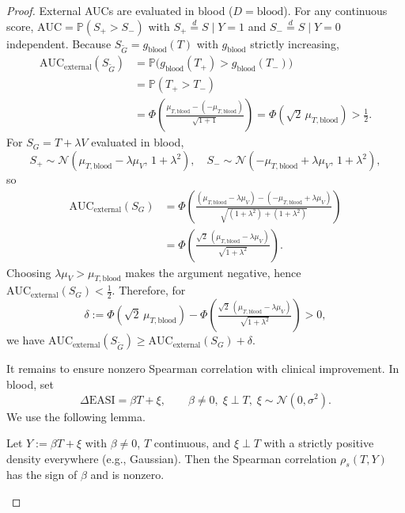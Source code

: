 \begin{proof}
External AUCs are evaluated in blood (\(D{=}\text{blood}\)). For any continuous score, \(\mathrm{AUC}=\mathbb P(S_+>S_-)\) with \(S_+\overset{d}{=}S\mid Y{=}1\) and \(S_-\overset{d}{=}S\mid Y{=}0\) independent. Because \(S_{\tilde G}=g_{\text{blood}}(T)\) with \(g_{\text{blood}}\) strictly increasing,
\[
\begin{aligned}
\mathrm{AUC}_{\text{external}}(S_{\tilde G})
&= \mathbb P\big(g_{\text{blood}}(T_+)>g_{\text{blood}}(T_-)\big)\\
&= \mathbb P(T_+>T_-)\\
&= \Phi\!\left(\frac{\mu_{T,\text{blood}}-(-\mu_{T,\text{blood}})}{\sqrt{1+1}}\right)
= \Phi(\sqrt{2}\,\mu_{T,\text{blood}}) > \tfrac12.
\end{aligned}
\]
For \(S_G=T+\lambda V\) evaluated in blood,
\[
S_+\sim\mathcal N(\mu_{T,\text{blood}}-\lambda\mu_V,\,1+\lambda^2),\quad S_-\sim\mathcal N(-\mu_{T,\text{blood}}+\lambda\mu_V,\,1+\lambda^2),
\]
so
\[
\begin{aligned}
\mathrm{AUC}_{\text{external}}(S_G)
&=\Phi\!\left(\frac{(\mu_{T,\text{blood}}-\lambda\mu_V)-(-\mu_{T,\text{blood}}+\lambda\mu_V)}{\sqrt{(1+\lambda^2)+(1+\lambda^2)}}\right)\\
&=\Phi\!\left(\frac{\sqrt{2}\,(\mu_{T,\text{blood}}-\lambda\mu_V)}{\sqrt{1+\lambda^2}}\right).
\end{aligned}
\]
Choosing \(\lambda\mu_V>\mu_{T,\text{blood}}\) makes the argument negative, hence \(\mathrm{AUC}_{\text{external}}(S_G)<\tfrac12\). Therefore, for
\[
\delta:=\Phi(\sqrt{2}\,\mu_{T,\text{blood}})-\Phi\!\left(\tfrac{\sqrt{2}\,(\mu_{T,\text{blood}}-\lambda\mu_V)}{\sqrt{1+\lambda^2}}\right)>0,
\]
we have \(\mathrm{AUC}_{\text{external}}(S_{\tilde G})\ge \mathrm{AUC}_{\text{external}}(S_G)+\delta\).

It remains to ensure nonzero Spearman correlation with clinical improvement. In blood, set
\[
\Delta\mathrm{EASI}=\beta T+\xi,\qquad \beta\neq 0,\; \xi\perp T,\; \xi\sim\mathcal N(0,\sigma^2).
\]
We use the following lemma.

\begin{lemma}\label{lem:rank-corr-noise}
Let \(Y:=\beta T+\xi\) with \(\beta\ne0\), \(T\) continuous, and \(\xi\perp T\) with a strictly positive density everywhere (e.g., Gaussian). Then the Spearman correlation \(\rho_s(T,Y)\) has the sign of \(\beta\) and is nonzero.
\end{lemma}


\end{proof}
